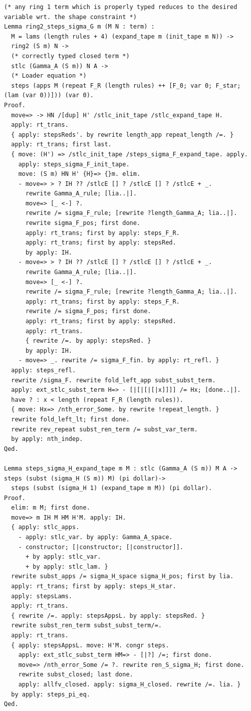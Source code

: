 \documentclass[10pt,a4paper]{amsart}
\begin{document}
\begin{lstlisting}
(* any ring 1 term which is properly typed reduces to the desired variable wrt. the shape constraint *)
Lemma ring2_steps_sigma_G m (M N : term) :
  M = lams (length rules + 4) (expand_tape m (init_tape m N)) ->
  ring2 (S m) N ->
  (* correctly typed closed term *)
  stlc (Gamma_A (S m)) N A ->
  (* Loader equation *)
  steps (apps M (repeat F_R (length rules) ++ [F_0; var 0; F_star; (lam (var 0))])) (var 0).
Proof.
  move=> -> HN /[dup] H' /stlc_init_tape /stlc_expand_tape H.
  apply: rt_trans.
  { apply: stepsReds'. by rewrite length_app repeat_length /=. }
  apply: rt_trans; first last.
  { move: (H') => /stlc_init_tape /steps_sigma_F_expand_tape. apply.
    apply: steps_sigma_F_init_tape.
    move: (S m) HN H' {H}=> {}m. elim.
    - move=> > ? IH ?? /stlcE [] ? /stlcE [] ? /stlcE + _.
      rewrite Gamma_A_rule; [lia..|].
      move=> [_ <-] ?.
      rewrite /= sigma_F_rule; [rewrite ?length_Gamma_A; lia..|].
      rewrite sigma_F_pos; first done.
      apply: rt_trans; first by apply: steps_F_R.
      apply: rt_trans; first by apply: stepsRed.
      by apply: IH.
    - move=> > ? IH ?? /stlcE [] ? /stlcE [] ? /stlcE + _.
      rewrite Gamma_A_rule; [lia..|].
      move=> [_ <-] ?.
      rewrite /= sigma_F_rule; [rewrite ?length_Gamma_A; lia..|].
      apply: rt_trans; first by apply: steps_F_R.
      rewrite /= sigma_F_pos; first done.
      apply: rt_trans; first by apply: stepsRed.
      apply: rt_trans.
      { rewrite /=. by apply: stepsRed. }
      by apply: IH.
    - move=> _. rewrite /= sigma_F_fin. by apply: rt_refl. }
  apply: steps_refl.
  rewrite /sigma_F. rewrite fold_left_app subst_subst_term.
  apply: ext_stlc_subst_term H=> - [|[|[|[|x]]]] /= Hx; [done..|].
  have ? : x < length (repeat F_R (length rules)).
  { move: Hx=> /nth_error_Some. by rewrite !repeat_length. }
  rewrite fold_left_lt; first done.
  rewrite rev_repeat subst_ren_term /= subst_var_term.
  by apply: nth_indep.
Qed.

Lemma steps_sigma_H_expand_tape m M : stlc (Gamma_A (S m)) M A -> steps (subst (sigma_H (S m)) M) (pi dollar)->
  steps (subst (sigma_H 1) (expand_tape m M)) (pi dollar).
Proof.
  elim: m M; first done.
  move=> m IH M HM H'M. apply: IH.
  { apply: stlc_apps.
    - apply: stlc_var. by apply: Gamma_A_space.
    - constructor; [|constructor; [|constructor]].
      + by apply: stlc_var.
      + by apply: stlc_lam. }
  rewrite subst_apps /= sigma_H_space sigma_H_pos; first by lia.
  apply: rt_trans; first by apply: steps_H_star.
  apply: stepsLams.
  apply: rt_trans.
  { rewrite /=. apply: stepsAppsL. by apply: stepsRed. }
  rewrite subst_ren_term subst_subst_term/=.
  apply: rt_trans.
  { apply: stepsAppsL. move: H'M. congr steps.
    apply: ext_stlc_subst_term HM=> - [|?] /=; first done.
    move=> /nth_error_Some /= ?. rewrite ren_S_sigma_H; first done.
    rewrite subst_closed; last done.
    apply: allfv_closed. apply: sigma_H_closed. rewrite /=. lia. }
  by apply: steps_pi_eq.
Qed.


\end{lstlisting}
\end{document}
